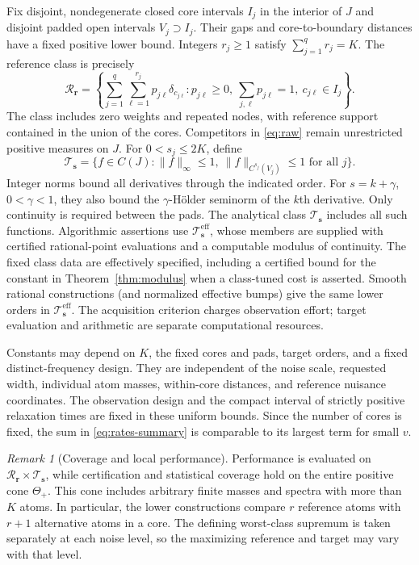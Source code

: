 \documentclass[10pt]{amsart}
\theoremstyle{definition}
\theoremstyle{remark}
\newtheorem{remark}[theorem]{Remark}
\newcommand{\ThetaAll}{\Theta_+}
\newcommand{\Tclass}{\mathcal T_{\boldsymbol s}}
\newcommand{\Teff}{\mathcal T_{\boldsymbol s}^{\mathrm{eff}}}
\newcommand{\Rclass}{\mathcal R_{\boldsymbol r}}
\begin{document}
Fix disjoint, nondegenerate closed core intervals $I_j$ in the interior of $J$ and disjoint padded open intervals $V_j\supset I_j$. Their gaps and core-to-boundary distances have a fixed positive lower bound. Integers $r_j\ge1$ satisfy $\sum_{j=1}^qr_j=K$. The reference class is precisely
\[
 \Rclass=\left\{\sum_{j=1}^q\sum_{\ell=1}^{r_j}p_{j\ell}\delta_{c_{j\ell}}:
 p_{j\ell}\ge0,\ \sum_{j,\ell}p_{j\ell}=1,\ c_{j\ell}\in I_j\right\}.
\]
The class includes zero weights and repeated nodes, with reference support contained in the union of the cores. Competitors in \eqref{eq:raw} remain unrestricted positive measures on $J$. For $0<s_j\le2K$, define
\begin{equation}\label{eq:targets}
 \Tclass=\{f\in C(J):\|f\|_\infty\le1,\ 
          \|f\|_{C^{s_j}(V_j)}\le1\text{ for all }j\}.
\end{equation}
Integer norms bound all derivatives through the indicated order. For $s=k+\gamma$, $0<\gamma<1$, they also bound the $\gamma$-H\"older seminorm of the $k$th derivative. Only continuity is required between the pads. The analytical class $\Tclass$ includes all such functions. Algorithmic assertions use $\Teff$, whose members are supplied with certified rational-point evaluations and a computable modulus of continuity. The fixed class data are effectively specified, including a certified bound for the constant in Theorem~\ref{thm:modulus} when a class-tuned cost is asserted. Smooth rational constructions (and normalized effective bumps) give the same lower orders in $\Teff$. The acquisition criterion charges observation effort; target evaluation and arithmetic are separate computational resources.

Constants may depend on $K$, the fixed cores and pads, target orders, and a fixed distinct-frequency design. They are independent of the noise scale, requested width, individual atom masses, within-core distances, and reference nuisance coordinates. The observation design and the compact interval of strictly positive relaxation times are fixed in these uniform bounds. Since the number of cores is fixed, the sum in \eqref{eq:rates-summary} is comparable to its largest term for small $v$.

\begin{remark}[Coverage and local performance]\label{rem:coverage}
Performance is evaluated on $\Rclass\times\Tclass$, while certification and statistical coverage hold on the entire positive cone $\ThetaAll$. This cone includes arbitrary finite masses and spectra with more than $K$ atoms. In particular, the lower constructions compare $r$ reference atoms with $r+1$ alternative atoms in a core. The defining worst-class supremum is taken separately at each noise level, so the maximizing reference and target may vary with that level.
\end{remark}
\end{document}

